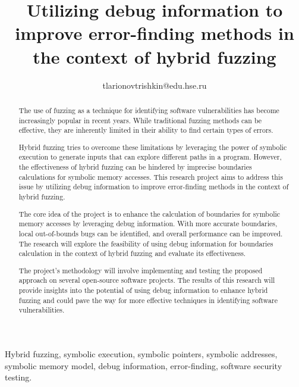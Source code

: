 \documentclass[conference]{IEEEtran}
\begin{document}
\title{Utilizing debug information to improve error-finding methods in the context of hybrid fuzzing}

\author{
    tlarionovtrishkin@edu.hse.ru
}

\maketitle

\begin{abstract}
    The use of fuzzing as a technique for identifying software vulnerabilities has become increasingly popular in recent years. While traditional fuzzing methods can be effective, they are inherently limited in their ability to find certain types of errors.

    Hybrid fuzzing tries to overcome these limitations by leveraging the power of symbolic execution to generate inputs that can explore different paths in a program. However, the effectiveness of hybrid fuzzing can be hindered by imprecise boundaries calculations for symbolic memory accesses. This research project aims to address this issue by utilizing debug information to improve error-finding methods in the context of hybrid fuzzing.

    The core idea of the project is to enhance the calculation of boundaries for symbolic memory accesses by leveraging debug information. With more accurate boundaries, local out-of-bounds bugs can be identified, and overall performance can be improved. The research will explore the feasibility of using debug information for boundaries calculation in the context of hybrid fuzzing and evaluate its effectiveness.

    The project's methodology will involve implementing and testing the proposed approach on several open-source software projects. The results of this research will provide insights into the potential of using debug information to enhance hybrid fuzzing and could pave the way for more effective techniques in identifying software vulnerabilities.
\end{abstract}

\IEEEoverridecommandlockouts
\begin{IEEEkeywords}
    Hybrid fuzzing, symbolic execution, symbolic pointers, symbolic addresses, symbolic memory model, debug information, error-finding, software security testing.
\end{IEEEkeywords}
\end{document}
